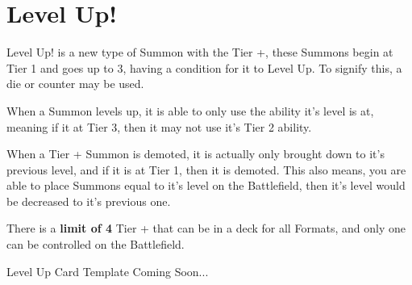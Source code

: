 \documentclass[12pt, letterpaper]{article}
\begin{document}
\section{Level Up!}
Level Up! is a new type of Summon with the Tier +, these Summons begin at Tier 1 and goes up to 3, 
having a condition for it to Level Up. To signify this, a die or counter may be used.
\par When a Summon levels up, it is able to only use the ability it's level is at, meaning if it at 
Tier 3, then it may not use it's Tier 2 ability.
\par When a Tier + Summon is demoted, it is actually only brought down to it's previous 
level, and if it is at Tier 1, then it is demoted. This also means, you are able to place Summons equal to
it's level on the Battlefield, then it's level would be decreased to it's previous one. 
\par There is a \textbf{limit of 4} Tier + that can be in a deck for all Formats, and only one can be controlled
on the Battlefield.  

\par Level Up Card Template Coming Soon...
\end{document}
